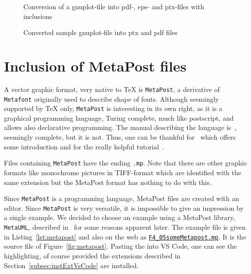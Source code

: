 \begin{figure}[htb]
\centering
{}
\caption{\label{fig:gp2pdf}Conversion of a gnuplot-file 
into pdf-, eps- and ptx-files with inclusions}
\end{figure}

\begin{figure}[htb]
\centering
{}
\caption{\label{fig:gnuplot}
Converted sample gnuplot-file into ptx and pdf files }
\end{figure}


\section{Inclusion of MetaPost files}\label{sec:metapost}

A vector graphic format, very native to TeX is \texttt{MetaPost}, 
a derivative of \texttt{Metafont} originally used to describe shape of fonts. 
Although seemingly supported by \TeX{} only, 
\texttt{MetaPost} is interesting in its own right, 
as it is a graphical programming language, 
Turing complete, much like postscript, and allows also declarative programming. 
The manual describing the language is~\cite{MPost}, 
seemingly complete, but it is not. 
Thus, one can be thankful for~\cite{MPostGuid} 
which offers some introduction and for the really helpful tutorial~\cite{MPostTut}. 

Files containing \texttt{MetaPost} have the ending \texttt{.mp}. 
Note that there are other graphic formats 
like monochrome pictures in TIFF-format 
which are identified with the same extension 
but the MetaPost format has nothing to do with this. 

Since \texttt{MetaPost} is a programming language, 
MetaPost files are created with an editor. 
Since \texttt{MetaPost} is very versatile, 
it is impossible to give an impression by a single example. 
We decided to choose an example 
using a MetaPost library, \texttt{MetaUML}, 
described in~\cite{MetaUml} for some reasons apparent later. 
The example file is given in Listing~\ref{lst:metapost} 
and also on the web as 
\href{\urlSite fromTex/F4_05someMetapost.mp}{\texttt{F4\_05someMetapost.mp}}. 
It is the source file of Figure~\ref{fig:metapost}. 
Pasting the into VS Code, one can see the highlighting, 
of course provided the extensions 
described in Section~\ref{subsec:instExtVsCode} are installed. 



